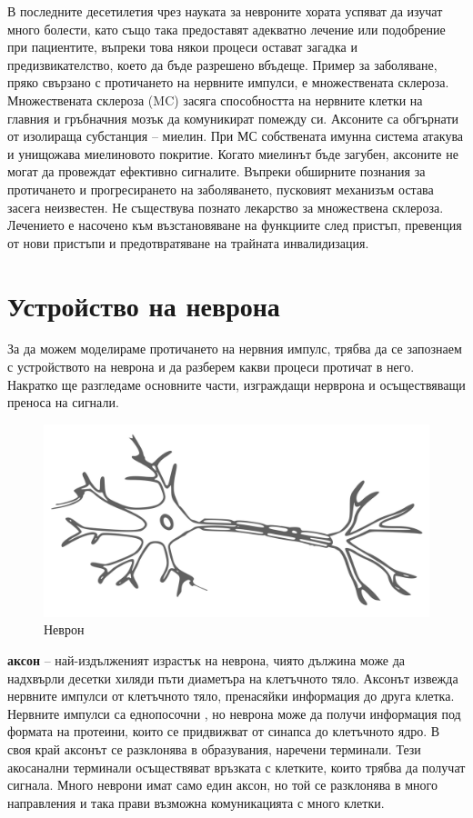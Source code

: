 \documentclass{article}
\numberwithin{equation}{section}
\begin{document}
В последните десетилетия чрез науката за невроните хората успяват да изучат много болести, като също така предоставят адекватно лечение или
подобрение при пациентите, въпреки това някои процеси остават загадка и предизвикателство, което да бъде разрешено вбъдеще. Пример за
заболяване, пряко свързано с протичането на нервните импулси, е множествената склероза. Множествената склероза (MC) засяга способността на
нервните клетки на главния и гръбначния мозък да комуникират помежду си. Аксоните са обгърнати от изолираща субстанция – миелин. При МС
собствената имунна система атакува и унищожава миелиновото покритие. Когато миелинът бъде загубен, аксоните не могат да провеждат ефективно
сигналите. Въпреки обширните познания за протичането и прогресирането на заболяването, пусковият механизъм остава засега неизвестен. Не
съществува познато лекарство за множествена склероза. Лечението е насочено към възстановяване на функциите след пристъп, превенция от нови
пристъпи и предотвратяване на трайната инвалидизация.

\section{Устройство на неврона}
За да можем моделираме протичането на нервния импулс, трябва да се запознаем с устройството на неврона и да разберем какви процеси протичат в него. Накратко ще разгледаме основните части, изграждащи нерврона и осъществяващи преноса на сигнали.

\begin{figure}[H]
    \centering
    \includegraphics[scale=0.5]{./schemas/Neurona.png}
    \caption{Неврон}
\end{figure}

\textbf{аксон} -- най-издълженият израстък на неврона, чиято дължина може да надхвърли десетки хиляди пъти диаметъра на клетъчното тяло. Аксонът
извежда нервните импулси от клетъчното тяло, пренасяйки информация до друга клетка. Нервните импулси са еднопосочни , но неврона
може да получи информация под формата на протеини, които се придвижват от синапса до клетъчното ядро. В своя край аксонът се разклонява в
образувания, наречени терминали. Тези акосанални терминали осъществяват връзката с клетките, които трябва да получат сигнала.  Много неврони
имат само един аксон, но той се разклонява в много направления и така прави възможна комуникацията с много клетки.
\end{document}
